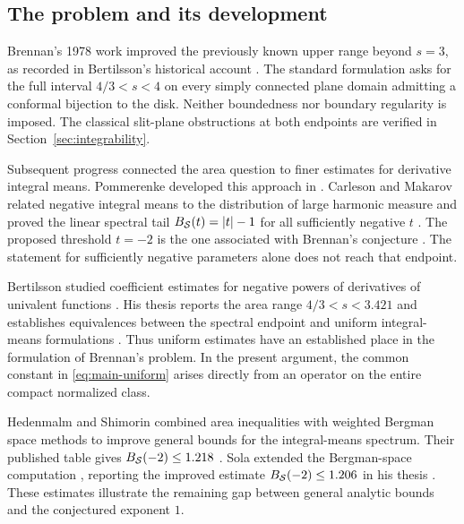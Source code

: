 \subsection{The problem and its development}

Brennan's 1978 work \cite{Brennan1978,Brennan1978LOMI} improved the
previously known upper range beyond $s=3$, as recorded in
Bertilsson's historical account \cite[Chapter~3, pp.~43--44]{Bertilsson1999}.
The standard formulation asks for the full interval $4/3<s<4$ on every
simply connected plane domain admitting a conformal bijection to the disk.
Neither boundedness nor boundary regularity is imposed. The classical
slit-plane obstructions at both endpoints are verified in
Section~\ref{sec:integrability}.

Subsequent progress connected the area question to finer estimates for
derivative integral means. Pommerenke developed this approach in
\cite{Pommerenke1985IntegralMeans,Pommerenke1985IntegralMeansII}.
Carleson and Makarov related negative integral means to the distribution
of large harmonic measure and proved the linear spectral tail
$B_{\mathcal S}(t)=|t|-1$ for all sufficiently negative $t$
\cite[\S1.4]{CarlesonMakarov1994}. The proposed threshold $t=-2$
is the one associated with Brennan's conjecture
\cite{HedenmalmShimorin2005}. The statement for sufficiently negative parameters alone
does not reach that endpoint.

Bertilsson studied coefficient estimates for negative powers of
derivatives of univalent functions \cite{Bertilsson1998}. His thesis
reports the area range $4/3<s<3.421$ \cite{Bertilsson1999} and
establishes equivalences between the spectral endpoint and
uniform integral-means formulations
\cite[Theorem~3.7, especially parts (a) and (f), pp.~44--45]{Bertilsson1999}.
Thus uniform estimates have an established place in the formulation of
Brennan's problem. In the present argument, the common constant in
\eqref{eq:main-uniform} arises directly from an operator on the entire
compact normalized class.

Hedenmalm and Shimorin combined area inequalities with weighted Bergman
space methods to improve general bounds for the integral-means spectrum.
Their published table gives $B_{\mathcal S}(-2)\le1.218$
\cite[Table~1, p.~385]{HedenmalmShimorin2005}.
Sola extended the Bergman-space computation
\cite{Sola2006}, reporting the improved estimate
$B_{\mathcal S}(-2)\le1.206$ in his thesis \cite[p.~6]{Sola2007Thesis}.
These estimates illustrate the remaining gap between general analytic
bounds and the conjectured exponent $1$.

